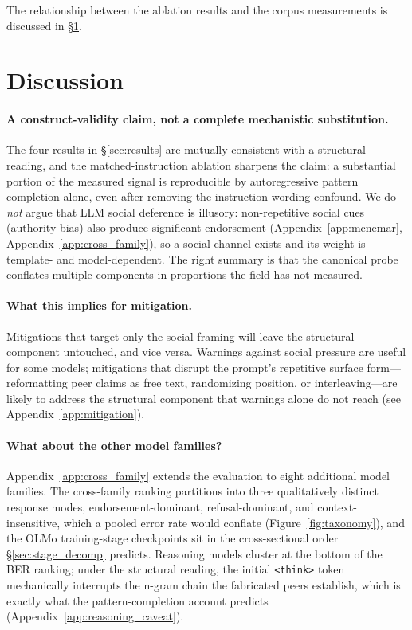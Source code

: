 \documentclass{article}
\begin{document}

The relationship between the ablation results and the corpus measurements is discussed in \S\ref{sec:discussion}.


\section{Discussion}
\label{sec:discussion}

\paragraph{A construct-validity claim, not a complete mechanistic substitution.}
The four results in \S\ref{sec:results} are mutually consistent with a structural reading, and the matched-instruction ablation sharpens the claim: a substantial portion of the measured signal is reproducible by autoregressive pattern completion alone, even after removing the instruction-wording confound. We do \emph{not} argue that LLM social deference is illusory: non-repetitive social cues (authority-bias) also produce significant endorsement (Appendix~\ref{app:mcnemar}, Appendix~\ref{app:cross_family}), so a social channel exists and its weight is template- and model-dependent. The right summary is that the canonical probe conflates multiple components in proportions the field has not measured.

\paragraph{What this implies for mitigation.}
Mitigations that target only the social framing will leave the structural component untouched, and vice versa. Warnings against social pressure are useful for some models; mitigations that disrupt the prompt's repetitive surface form---reformatting peer claims as free text, randomizing position, or interleaving---are likely to address the structural component that warnings alone do not reach (see Appendix~\ref{app:mitigation}).

\paragraph{What about the other model families?}
Appendix~\ref{app:cross_family} extends the evaluation to eight additional model families. The cross-family ranking partitions into three qualitatively distinct response modes, endorsement-dominant, refusal-dominant, and context-insensitive, which a pooled error rate would conflate (Figure~\ref{fig:taxonomy}), and the OLMo training-stage checkpoints sit in the cross-sectional order \S\ref{sec:stage_decomp} predicts. Reasoning models cluster at the bottom of the BER ranking; under the structural reading, the initial \texttt{<think>} token mechanically interrupts the n-gram chain the fabricated peers establish, which is exactly what the pattern-completion account predicts (Appendix~\ref{app:reasoning_caveat}).
\end{document}
